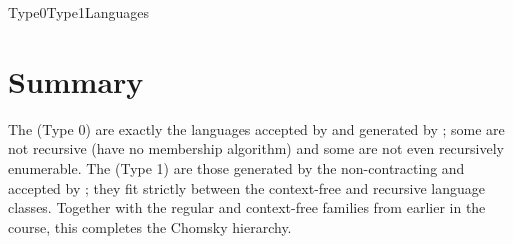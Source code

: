 \documentclass[hidelinks]{article}
\begin{document}
\begin{smodule}[title={Type 0 and Type 1 Languages and their Automata}]{Type0Type1Languages}
\section{Summary}

The  (Type 0) are exactly the languages accepted by  and generated by ; some are not recursive (have no membership algorithm) and some are not even recursively enumerable. The  (Type 1) are those generated by the non-contracting  and accepted by ; they fit strictly between the context-free and recursive language classes. Together with the regular and context-free families from earlier in the course, this completes the Chomsky hierarchy.

\end{smodule}
\end{document}
